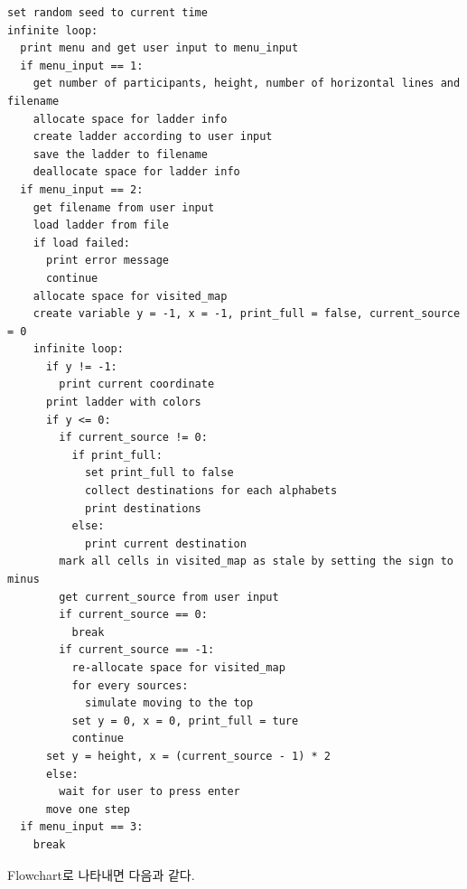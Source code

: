 \documentclass[titlepage]{article}
\begin{document}
\begin{lstlisting}
set random seed to current time
infinite loop:
  print menu and get user input to menu_input
  if menu_input == 1:
    get number of participants, height, number of horizontal lines and filename
    allocate space for ladder info
    create ladder according to user input
    save the ladder to filename
    deallocate space for ladder info
  if menu_input == 2:
    get filename from user input
    load ladder from file
    if load failed:
      print error message
      continue
    allocate space for visited_map
    create variable y = -1, x = -1, print_full = false, current_source = 0
    infinite loop:
      if y != -1:
        print current coordinate
      print ladder with colors
      if y <= 0:
        if current_source != 0:
          if print_full:
            set print_full to false
            collect destinations for each alphabets
            print destinations
          else:
            print current destination
        mark all cells in visited_map as stale by setting the sign to minus
        get current_source from user input
        if current_source == 0:
          break
        if current_source == -1:
          re-allocate space for visited_map
          for every sources:
            simulate moving to the top
          set y = 0, x = 0, print_full = ture
          continue
      set y = height, x = (current_source - 1) * 2
      else:
        wait for user to press enter
      move one step
  if menu_input == 3:
    break
\end{lstlisting}

Flowchart로 나타내면 다음과 같다.
\end{document}
